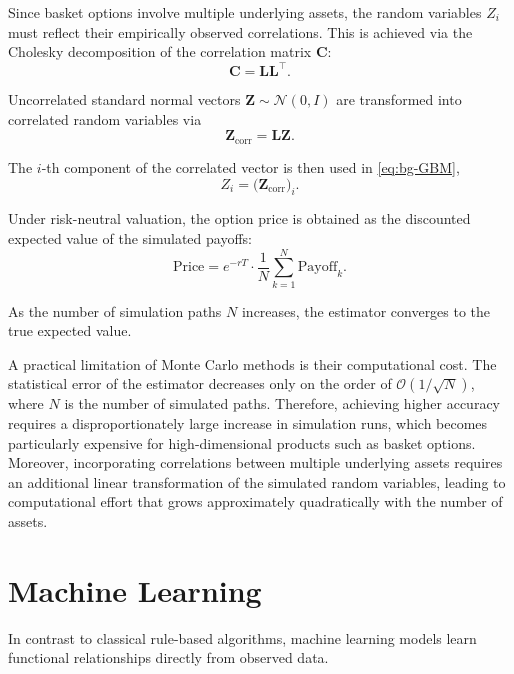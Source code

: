Since basket options involve multiple underlying assets, the random variables $Z_i$ must reflect their empirically observed correlations. This is achieved via the Cholesky decomposition of the correlation matrix $\mathbf{C}$:
\begin{equation}
\mathbf{C} = \mathbf{L}\mathbf{L}^\top.
\label{eq:bg-Cholesky}
\end{equation}

Uncorrelated standard normal vectors $\mathbf{Z} \sim \mathcal{N}(0,I)$ are transformed into correlated random variables via
\begin{equation}
\mathbf{Z}_{\text{corr}} = \mathbf{L}\mathbf{Z}.
\end{equation}

The $i$-th component of the correlated vector is then used in \eqref{eq:bg-GBM},
\[
Z_i = \big(\mathbf Z_{\text{corr}}\big)_i .
\]

Under risk-neutral valuation, the option price is obtained as the discounted
expected value of the simulated payoffs:
\begin{equation}
\text{Price}
=
e^{-rT}
\cdot
\frac{1}{N}
\sum_{k=1}^{N}
\text{Payoff}_k.
\end{equation}

As the number of simulation paths $N$ increases, the estimator converges to the true expected value.

A practical limitation of Monte Carlo methods is their computational cost. 
The statistical error of the estimator decreases only on the order of
$\mathcal{O}(1/\sqrt{N})$, where $N$ is the number of simulated paths. 
Therefore, achieving higher accuracy requires a disproportionately large increase 
in simulation runs, which becomes particularly expensive for high-dimensional 
products such as basket options. 
Moreover, incorporating correlations between multiple underlying assets
requires an additional linear transformation of the simulated random variables,
leading to computational effort that grows approximately quadratically
with the number of assets.



    
\section{Machine Learning}
\label{sec:bg-machine-learning}

In contrast to classical rule-based algorithms, machine learning models learn functional relationships directly from observed data.

